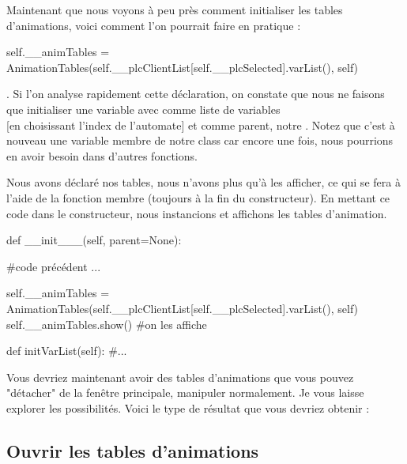 Maintenant que nous voyons à peu près comment initialiser les tables d'animations, voici comment l'on pourrait faire en pratique :
\begin{pyCode}
self.__animTables = AnimationTables(self.__plcClientList[self.__plcSelected].varList(), self)
\end{pyCode}
.
Si l'on analyse rapidement cette déclaration, on constate que nous ne faisons que initialiser une variable  avec comme liste de variables \\  [en choisissant l'index de l'automate] et comme parent, notre .\newline
Notez que c'est à nouveau une variable membre de notre class  car encore une fois, nous pourrions en avoir besoin dans d'autres fonctions.\smallSkip

Nous avons déclaré nos tables, nous n'avons plus qu'à les afficher, ce qui se fera à l'aide de la fonction membre  (toujours à la fin du constructeur).
En mettant ce code dans le constructeur, nous instancions et affichons les tables d'animation.
\begin{pyCode}

def __init___(self, parent=None):

    #code précédent ...
    
    self.__animTables = AnimationTables(self.__plcClientList[self.__plcSelected].varList(), self)
    self.__animTables.show() #on les affiche
    
def initVarList(self):
    #...
\end{pyCode}
\smallSkip

\smallSkip

Vous devriez maintenant avoir des tables d'animations que vous pouvez "détacher" de la fenêtre principale, manipuler normalement. Je vous laisse explorer les possibilités.\newline
Voici le type de résultat que vous devriez obtenir :


\subsection{Ouvrir les tables d'animations}


